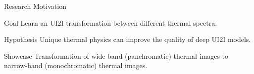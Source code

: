 \begin{frame}{Research Motivation}
  \vspace{-0.5cm}
  \begin{exampleblock}{Goal}
    Learn an UI2I transformation between different thermal spectra.
  \end{exampleblock} 
  \begin{exampleblock}{Hypothesis}
    Unique thermal physics can improve the quality of deep UI2I models.
  \end{exampleblock}  
  \begin{exampleblock}{Showcase}
    Transformation of wide-band (panchromatic) thermal images to narrow-band (monochromatic) thermal images.
  \end{exampleblock}
\end{frame}